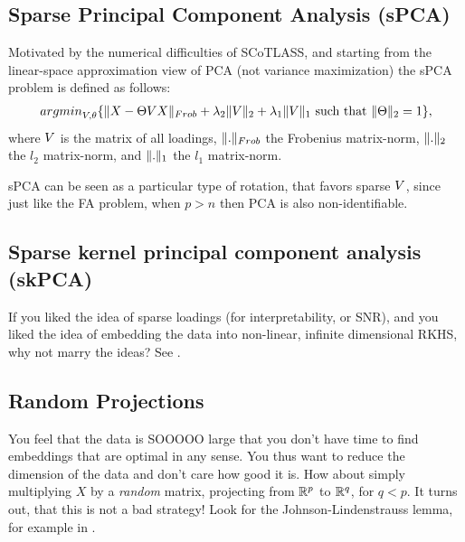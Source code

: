 \documentclass[12pt,a4paper]{article}
\begin{document}
\subsection{Sparse Principal Component Analysis (sPCA)}
\label{sec:sPCA}

Motivated by the numerical difficulties of SCoTLASS, and starting from the linear-space approximation view of PCA (not variance maximization) the sPCA problem is defined as follows:
\begin{align}
\label{eq:spca}
	\textstyle{\mathop{argmin}_{V,\theta}}\{ \Vert X-\Theta V X \Vert_{Frob} + \lambda_2 \Vert V \Vert_2 + \lambda_1 \Vert V \Vert_1 \text{ such that } \Vert \Theta \Vert_2=1 \},
\end{align}
where $V$ is the matrix of all loadings, $\Vert . \Vert_{Frob}$ the Frobenius matrix-norm, $\Vert . \Vert_2$ the $l_2$ matrix-norm, and $\Vert . \Vert_1$ the $l_1$ matrix-norm.


\begin{remark}
	sPCA can be seen as a particular type of rotation, that favors sparse $V$, since just like the FA problem, when $p>n$ then PCA is also non-identifiable. 
\end{remark}





\subsection{Sparse kernel principal component analysis (skPCA)}
If you liked the idea of sparse loadings (for interpretability, or SNR), and you liked the idea of embedding the data into non-linear, infinite dimensional RKHS, why not marry the ideas?
See \citet{tipping2001sparse}.



\subsection{Random Projections}
You feel that the data is SOOOOO large that you don't have time to find embeddings that are optimal in any sense. 
You thus want to reduce the dimension of the data and don't care how good it is. 
How about simply multiplying $X$ by a \emph{random} matrix, projecting from $\mathbb{R}^p$ to $\mathbb{R}^q$, for $q<p$.
It turns out, that this is not a bad strategy!
Look for the Johnson-Lindenstrauss lemma, for example in \citet{mohri2012foundations}.


\newpage


\end{document}
